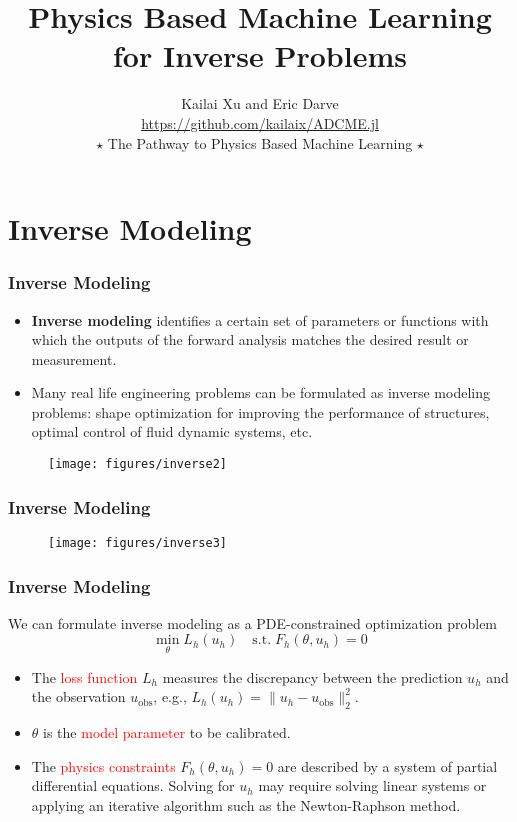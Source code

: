 \documentclass[usenames,dvipsnames]{beamer}
\title[Physics Based Machine Learning]{Physics Based Machine Learning for Inverse Problems} %
\author[ADCME]{Kailai Xu and Eric Darve\\\quad\url{https://github.com/kailaix/ADCME.jl} \qquad      \\ $\star$ The Pathway to Physics Based Machine Learning $\star$} %
\date{}%
\begin{document}
\begin{frame}

\titlepage %

\end{frame}
\usebackgroundtemplate{}

\section{Inverse Modeling}



\begin{frame}
	\frametitle{Inverse Modeling}
	\begin{itemize}
		\item \textbf{Inverse modeling} identifies a certain set of parameters or functions with which the outputs of the forward analysis matches the desired result or measurement.
		\item Many real life engineering problems can be formulated as inverse modeling problems: shape optimization for improving the performance of structures, optimal control of fluid dynamic systems, etc.
	\end{itemize}
	\begin{figure}[hbt]
	\centering
  \texttt{[image: figures/inverse2]}
\end{figure}
\end{frame}

\begin{frame}
	\frametitle{Inverse Modeling}
	\begin{figure}
	\centering
  \texttt{[image: figures/inverse3]}
\end{figure}
\end{frame}

\begin{frame}
	\frametitle{Inverse Modeling}
	We can formulate inverse modeling as a PDE-constrained optimization problem 
	\begin{equation*}
		\min_{\theta} L_h(u_h) \quad \mathrm{s.t.}\; F_h(\theta, u_h) = 0
	\end{equation*}
	\begin{itemize}
		\item The \textcolor{red}{loss function} $L_h$ measures the discrepancy between the prediction $u_h$ and the observation $u_{\mathrm{obs}}$, e.g., $L_h(u_h) = \|u_h - u_{\mathrm{obs}}\|_2^2$. 
		\item $\theta$ is the \textcolor{red}{model parameter} to be calibrated. 
		\item The \textcolor{red}{physics constraints} $F_h(\theta, u_h)=0$ are described by a system of partial differential equations. Solving for $u_h$ may require solving linear systems or applying an iterative algorithm such as the Newton-Raphson method. 
	\end{itemize}
\end{frame}
\end{document}
